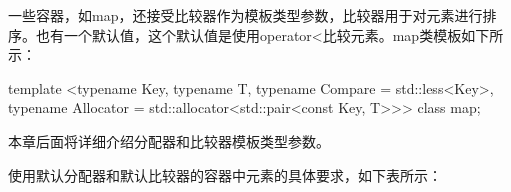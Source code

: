 一些容器，如map，还接受比较器作为模板类型参数，比较器用于对元素进行排序。也有一个默认值，这个默认值是使用operator<比较元素。map类模板如下所示：

\begin{cpp}
template <typename Key, typename T, typename Compare = std::less<Key>,
    typename Allocator = std::allocator<std::pair<const Key, T>>> class map;
\end{cpp}

本章后面将详细介绍分配器和比较器模板类型参数。

使用默认分配器和默认比较器的容器中元素的具体要求，如下表所示：


